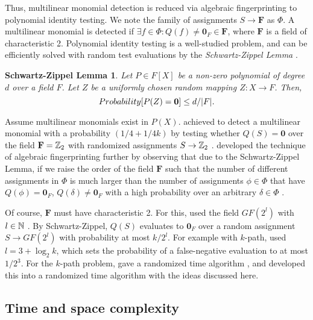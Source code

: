 Thus, multilinear monomial detection is reduced via algebraic fingerprinting 
to polynomial identity testing. 
We note the family of assignments $S \to \mathbf{F}$ as $\Phi$. 
A multilinear monomial is detected if 
$\exists f \in \Phi \colon Q(f) \neq \mathbf{0}_F \in \mathbf{F}$, 
where $\mathbf{F}$ is a field of characteristic 2. 
Polynomial identity testing is a well-studied problem, and can be efficiently 
solved with random test evaluations by the \emph{Schwartz-Zippel Lemma} \cite{Saxena09}.

\newtheorem*{lemmaSZ}{Schwartz-Zippel Lemma}
\begin{lemmaSZ}
  Let $P \in F[X]$ be a non-zero polynomial of degree $d$ over a field $F$. 
  Let $Z$ be a uniformly chosen random mapping $Z \colon X \to F$. Then, 
  \[
    Probability[P(Z) = \mathbf{0}] \leq d/{{\left\vert F\right\vert}}.  
  \]
\end{lemmaSZ}

Assume multilinear monomials exist in $P(X)$. 
\citeauthor{Koutis08} achieved to detect a multilinear monomial 
with a probability $(1/4 + 1/{4k})$ by testing whether 
$Q(S) = \mathbf{0}$ over the field $\mathbf{F} = \mathbb Z_2$  
with randomized assignments $S \to \mathbb Z_2$ \cite{Koutis08}. 
\citeauthor{Williams09} developed the technique of algebraic fingerprinting 
further by observing that due to the Schwartz-Zippel Lemma, %
if we raise the order of the field $\mathbf{F}$ 
such that the number of different assignments in $\Phi$ is much larger than 
the number of assignments $\phi \in \Phi$ that have $Q(\phi) = \mathbf{0}_F$, 
$Q(\delta) \neq \mathbf{0}_F$ with a high probability over an arbitrary $\delta \in \Phi$ 
\cite{Williams09}. 

Of course, $\mathbf{F}$ must have characteristic 2. For this, \citeauthor{Williams09} 
used the field $GF(2^{l})$ with $l \in \mathbb N$ \cite{Williams09}. By Schwartz-Zippel, $Q(S)$ 
evaluates to $\mathbf{0}_F$ over a random assignment $S \to GF(2^{l})$ with probability 
at most $k/{2^l}$. For example with $k$-path, 
\citeauthor{Williams09} used $l = 3 + \log_2k$, 
which sets the probability of a false-negative evaluation 
to at most $1/2^3$. 
For the $k$-path problem, \citeauthor{Koutis08} 
gave a randomized  time algorithm \cite{Koutis08}, 
and \citeauthor{Williams09} developed this into a randomized  
time algorithm \cite{Williams09} with the ideas discussed here.

\subsection{Time and space complexity}
\label{sect:complexity}

